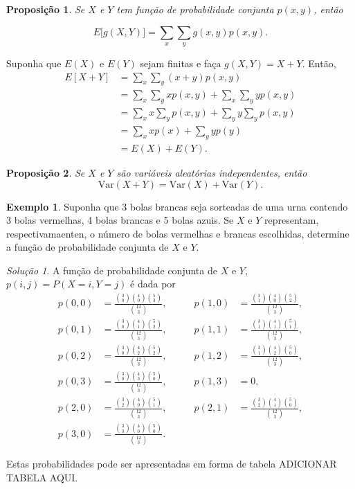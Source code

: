 \documentclass[]{book}
\newtheorem{proposition}{Proposição}[chapter]
\theoremstyle{definition}
\theoremstyle{definition}
\newtheorem{example}{Exemplo}[chapter]
\theoremstyle{definition}
\theoremstyle{remark}
\newtheorem*{solution}{Solução}
\begin{document}
\begin{proposition}
\protect\hypertarget{prp:unnamed-chunk-206}{}{\label{prp:unnamed-chunk-206} }Se \(X\) e \(Y\) tem função de probabilidade conjunta \(p(x,y)\), então
\end{proposition}
\[E\big[g(X,Y)\big] = \sum_{x}\sum_{y}g(x,y)p(x,y).\]

Suponha que \(E(X)\) e \(E(Y)\) sejam finitas e faça \(g(X,Y)=X+Y\).
Então,
\begin{align}
E[X+Y] &= \sum_{x}\sum_{y}(x+y)p(x,y)\\
&=\sum_{x}\sum_{y}x p(x,y) + \sum_{x}\sum_{y}y p(x,y)\\
&=\sum_{x}x\sum_{y} p(x,y) + \sum_{y}y\sum_{y} p(x,y)\\
&=\sum_{x}x p(x) + \sum_{y}y p(y)\\
&= E(X) + E(Y).
\label{eq:esperancaSoma}
\end{align}

\begin{proposition}
\protect\hypertarget{prp:propSomaVar}{}{\label{prp:propSomaVar} }Se \(X\) e \(Y\) são variáveis aleatórias independentes, então
\[\mathrm{Var}(X+Y)=\mathrm{Var}(X)+\mathrm{Var}(Y).\]
\end{proposition}

\begin{example}
\protect\hypertarget{exm:unnamed-chunk-207}{}{\label{exm:unnamed-chunk-207} }Suponha que 3 bolas brancas seja sorteadas de uma urna contendo 3 bolas vermelhas, 4 bolas brancas e 5 bolas azuis.
Se \(X\) e \(Y\) representam, respectivamaenten, o número de bolas vermelhas e brancas escolhidas, determine a função de probabilidade conjunta de \(X\) e \(Y\).
\end{example}
\begin{solution}
\iffalse{} {Solução. } \fi{}A função de probabilidade conjunta de \(X\) e \(Y\), \(p(i,j)=P(X=i,Y=j)\) é dada por
\begin{align}
p(0,0) &= \frac{{3\choose 0}{4\choose 0}{5\choose 3}}{{12 \choose 3}}, 
 &\qquad p(1,0) &= \frac{{3\choose 1}{4\choose 0}{5\choose 2}}{{12 \choose 3}},\\
p(0,1) &= \frac{{3\choose 0}{4\choose 1}{5\choose 2}}{{12 \choose 3}}, 
 &\qquad p(1,1) &= \frac{{3\choose 1}{4\choose 1}{5\choose 1}}{{12 \choose 3}},\\
p(0,2) &= \frac{{3\choose 0}{4\choose 2}{5\choose 2}}{{12 \choose 3}}, 
 &\qquad p(1,2) &= \frac{{3\choose 1}{4\choose 2}{5\choose 0}}{{12 \choose 3}},\\
p(0,3) &= \frac{{3\choose 0}{4\choose 3}{5\choose 0}}{{12 \choose 3}},
 &\qquad p(1,3) &= 0,\\
p(2,0) &= \frac{{3\choose 2}{4\choose 0}{5\choose 1}}{{12 \choose 3}}, 
 &\qquad p(2,1) &= \frac{{3\choose 2}{4\choose 1}{5\choose 0}}{{12 \choose 3}},\\
p(3,0) &= \frac{{3\choose 3}{4\choose 0}{5\choose 0}}{{12 \choose 3}}. 
\end{align}

Estas probabilidades pode ser apresentadas em forma de tabela ADICIONAR TABELA AQUI.
\end{solution}
\end{document}
